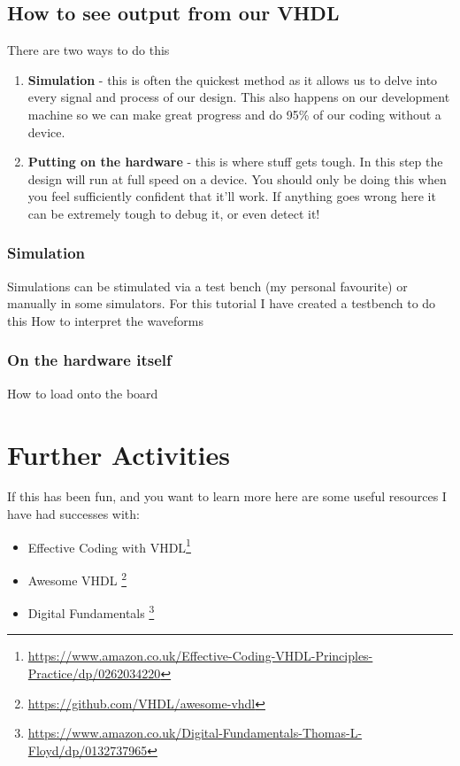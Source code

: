 \documentclass[11pt,a4paper]{article}
\begin{document}
\subsection{How to see output from our VHDL}
There are two ways to do this
\begin{enumerate}
    \item \textbf{Simulation} - this is often the quickest method as it allows us to delve into every signal and process of our design. This also happens on our development machine so we can make great progress and do 95\% of our coding without a device.
    \item \textbf{Putting on the hardware} - this is where stuff gets tough. In this step the design will run at full speed on a device. You should only be doing this when you feel sufficiently confident that it'll work. If anything goes wrong here it can be extremely tough to debug it, or even detect it! 
\end{enumerate}
\subsubsection{Simulation}
Simulations can be stimulated via a test bench (my personal favourite) or manually in some simulators. For this tutorial I have created a testbench to do this
How to interpret the waveforms
\subsubsection{On the hardware itself}
How to load onto the board

\section{Further Activities}
If this has been fun, and you want to learn more here are some useful resources I have had successes with:

\begin{itemize}
    \item Effective Coding with VHDL\footnote{\url{https://www.amazon.co.uk/Effective-Coding-VHDL-Principles-Practice/dp/0262034220}} 
    \item Awesome VHDL \footnote{\url{https://github.com/VHDL/awesome-vhdl}}
    \item Digital Fundamentals \footnote{\url{https://www.amazon.co.uk/Digital-Fundamentals-Thomas-L-Floyd/dp/0132737965}}
\end{itemize}
\end{document}
